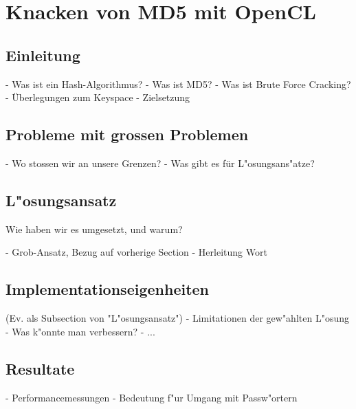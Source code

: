 \chapter{Knacken von MD5 mit OpenCL}
\begin{refsection}


\section{Einleitung}

- Was ist ein Hash-Algorithmus?
- Was ist MD5?
- Was ist Brute Force Cracking?
- Überlegungen zum Keyspace
- Zielsetzung

\section{Probleme mit grossen Problemen}

- Wo stossen wir an unsere Grenzen?
- Was gibt es für L"osungsans"atze?

\section{L"osungsansatz}

Wie haben wir es umgesetzt, und warum?

- Grob-Ansatz, Bezug auf vorherige Section
- Herleitung Wort

\section{Implementationseigenheiten}

(Ev. als Subsection von "L"osungsansatz")
- Limitationen der gew"ahlten L"osung
- Was k"onnte man verbessern?
- ...

\section{Resultate}

- Performancemessungen
- Bedeutung f"ur Umgang mit Passw"ortern

\printbibliography[heading=subbibliography]
\end{refsection}
